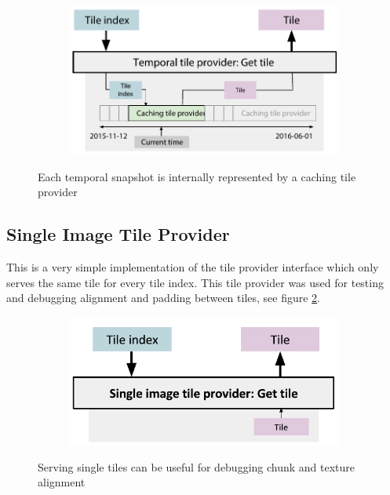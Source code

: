 \begin{figure}[htbp]
    \centering
    \begin{subfigure}[bt]{0.7\textwidth}
        \includegraphics[width=\textwidth]{figures/implementation/tileprovider/temporaltileprovider_gettile.pdf}
    \end{subfigure}
    \caption{Each temporal snapshot is internally represented by a caching tile provider}
    \label{fig:temporaltileprovider_gettile}
\end{figure}


\subsection{Single Image Tile Provider}
This is a very simple implementation of the tile provider interface which only serves the same tile for every tile index. This tile provider was used for testing and debugging alignment and padding between tiles, see figure \ref{fig:singleimagetileprovider_gettile}.

\begin{figure}[htbp]
    \centering
    \begin{subfigure}[bt]{0.5\textwidth}
        \includegraphics[width=\textwidth]{figures/implementation/tileprovider/singleimagetileprovider_gettile.pdf}
    \end{subfigure}
    \caption{Serving single tiles can be useful for debugging chunk and texture alignment}
    \label{fig:singleimagetileprovider_gettile}
\end{figure}

